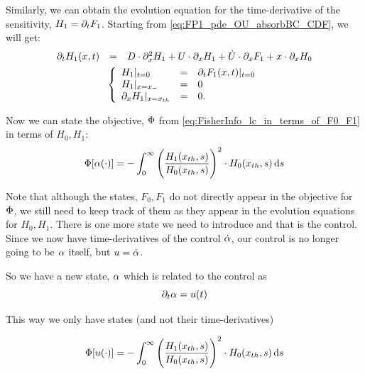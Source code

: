 \documentclass{article}
\begin{document}
Similarly, we can obtain the evolution equation for the time-derivative of the
sensitivity, $H_1 = {\partial}_t F_1$.
Starting from \cref{eq:FP1_pde_OU_absorbBC_CDF}, we will get:
\begin{equation}
\begin{gathered}
\begin{array}{lcl}
	{\partial}_t H_1(x,t) &=&
					D \cdot {\partial}^2_x H_1 +  
					U  \cdot {\partial}_x H_1 +
					{ \dot{U}} \cdot {\partial}_x F_1 +
					x \cdot {\partial}_x H_0	
\end{array}
	\\
	\left\{ \begin{array}{lcl}
	H_1 |_{t = 0} &=& {\partial}_t F_1(x,t)|_{t=0}
	\\
	H_1 |_{x={ x_{-} }} &=& 0 
	\\
	{\partial}_x H_1 |_{x={ x_{th} }} &=& 0.
	\end{array} \right.
\label{eq:H1_pde_OU_absorbBC_CDF}
\end{gathered}
\end{equation}

Now we can state the objective, ${\Phi}$ from
\cref{eq:FisherInfo_lc_in_terms_of_F0_F1} in terms of $H_0,
H_1$:
\begin{equation}
 {\Phi}[{\alpha}(\cdot)] =
-\int_0^{\infty}  \Bigg( \frac{H_1({ x_{th} },s)}
							  {H_0({ x_{th} },s)} \Bigg)^2  
\cdot H_0({ x_{th} }, s)  \, \mathrm{d} s
\label{eq:FisherInfo_lc_in_terms_of_F0_F1_H0_H1} 
\end{equation}

Note that although the states, $F_0, F_1$ do not directly appear in the
objective for ${\Phi}$, we still need to keep track of them as they appear in the
evolution equations for $H_0, H_1$. There is one more state we need to introduce
and that is the control. Since we now have time-derivatives of the control
${ \dot{\alpha} }$, our control is no longer going to be ${\alpha}$ itself, but $u = { \dot{\alpha} }$.

So we have a new state, ${\alpha}$ which is related to the control as $$
{\partial}_t {\alpha} = u(t)$$

This way we only have states (and not their time-derivatives)

\begin{equation}
 {\Phi}[u(\cdot)] =
-\int_0^{\infty}  \Bigg( \frac{H_1({ x_{th} },s)}
							  {H_0({ x_{th} },s)} \Bigg)^2  
\cdot H_0({ x_{th} }, s)  \, \mathrm{d} s
\label{eq:FisherInfo_lc_in_terms_of_F0_F1_H0_H1_alpha} 
\end{equation}
\end{document}
